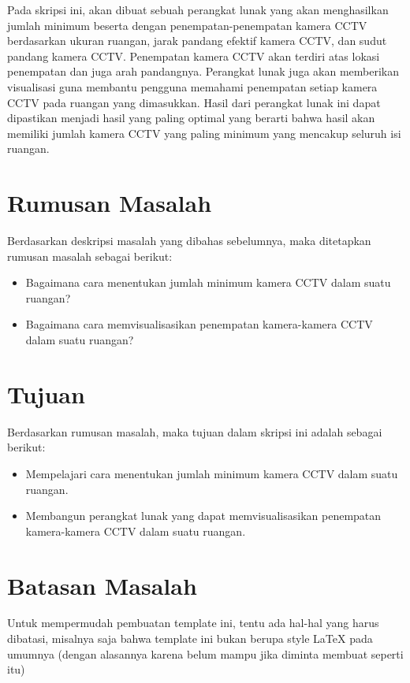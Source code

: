 Pada skripsi ini, akan dibuat sebuah perangkat lunak yang akan menghasilkan jumlah minimum beserta dengan penempatan-penempatan kamera CCTV berdasarkan ukuran ruangan, jarak pandang efektif kamera CCTV, dan sudut pandang kamera CCTV. Penempatan kamera CCTV akan terdiri atas lokasi penempatan dan juga arah pandangnya. Perangkat lunak juga akan memberikan visualisasi guna membantu pengguna memahami penempatan setiap kamera CCTV pada ruangan yang dimasukkan. Hasil dari perangkat lunak ini dapat dipastikan menjadi hasil yang paling optimal yang berarti bahwa hasil akan memiliki jumlah kamera CCTV yang paling minimum yang mencakup seluruh isi ruangan.

\section{Rumusan Masalah}
\label{sec:rumusan}

Berdasarkan deskripsi masalah yang dibahas sebelumnya, maka ditetapkan rumusan masalah sebagai berikut:

\begin{itemize}
	\item Bagaimana cara menentukan jumlah minimum kamera CCTV dalam suatu ruangan?
	\item Bagaimana cara memvisualisasikan penempatan kamera-kamera CCTV dalam suatu ruangan?
\end{itemize}

\section{Tujuan}
\label{sec:tujuan}

Berdasarkan rumusan masalah, maka tujuan dalam skripsi ini adalah sebagai berikut:

\begin{itemize}
	\item Mempelajari cara menentukan jumlah minimum kamera CCTV dalam suatu ruangan.
	\item Membangun perangkat lunak yang dapat memvisualisasikan penempatan kamera-kamera CCTV dalam suatu ruangan.
\end{itemize}

\section{Batasan Masalah}
\label{sec:batasan}
Untuk mempermudah pembuatan template ini, tentu ada hal-hal yang harus dibatasi, misalnya saja bahwa template ini bukan berupa style \LaTeX{} pada umumnya (dengan alasannya karena belum mampu jika diminta membuat seperti itu)

